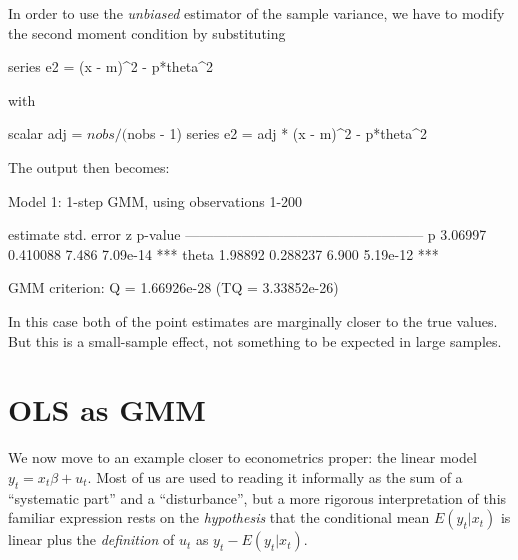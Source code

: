 In order to use the \textit{unbiased} estimator of the sample
variance, we have to modify the second moment condition by
substituting
\begin{code}
series e2 = (x - m)^2 - p*theta^2
\end{code}
with
\begin{code}
scalar adj = $nobs / ($nobs - 1)
series e2 = adj * (x - m)^2 - p*theta^2
\end{code}
The output then becomes:
\begin{code}
Model 1: 1-step GMM, using observations 1-200

             estimate   std. error     z     p-value 
  ---------------------------------------------------
  p          3.06997     0.410088    7.486   7.09e-14 ***
  theta      1.98892     0.288237    6.900   5.19e-12 ***

  GMM criterion: Q = 1.66926e-28 (TQ = 3.33852e-26)
\end{code}
In this case both of the point estimates are marginally closer to the
true values. But this is a small-sample effect, not something to
be expected in large samples.

\section{OLS as GMM}
\label{sec:gmm-ols}

We now move to an example closer to econometrics proper: the linear
model $y_t = x_t \beta + u_t$.  Most of us are used to reading it
informally as the sum of a ``systematic part'' and a ``disturbance'',
but a more rigorous interpretation of this familiar expression rests
on the \emph{hypothesis} that the conditional mean $E(y_t|x_t)$ is
linear plus the \emph{definition} of $u_t$ as $y_t - E(y_t|x_t)$.

